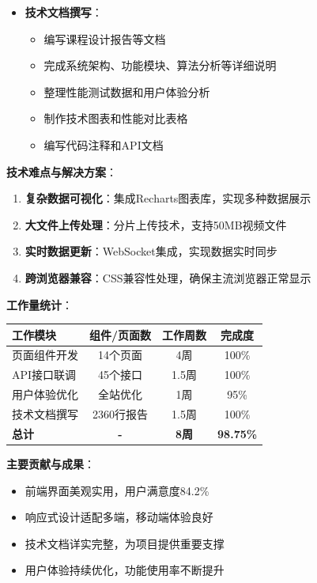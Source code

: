 \documentclass[12pt,a4paper]{article}
\begin{document}
\begin{itemize}
    \item \textbf{技术文档撰写}：
    \begin{itemize}
        \item 编写课程设计报告等文档
        \item 完成系统架构、功能模块、算法分析等详细说明
        \item 整理性能测试数据和用户体验分析
        \item 制作技术图表和性能对比表格
        \item 编写代码注释和API文档
    \end{itemize}
\end{itemize}

\textbf{技术难点与解决方案}：
\begin{enumerate}
    \item \textbf{复杂数据可视化}：集成Recharts图表库，实现多种数据展示
    \item \textbf{大文件上传处理}：分片上传技术，支持50MB视频文件
    \item \textbf{实时数据更新}：WebSocket集成，实现数据实时同步
    \item \textbf{跨浏览器兼容}：CSS兼容性处理，确保主流浏览器正常显示
\end{enumerate}

\textbf{工作量统计}：
\begin{center}
\begin{tabular}{|l|c|c|c|}
\hline
\textbf{工作模块} & \textbf{组件/页面数} & \textbf{工作周数} & \textbf{完成度} \\
\hline
页面组件开发 & 14个页面 & 4周 & 100\% \\
API接口联调 & 45个接口 & 1.5周 & 100\% \\
用户体验优化 & 全站优化 & 1周 & 95\% \\
技术文档撰写 & 2360行报告 & 1.5周 & 100\% \\
\hline
\textbf{总计} & \textbf{-} & \textbf{8周} & \textbf{98.75\%} \\
\hline
\end{tabular}
\end{center}

\textbf{主要贡献与成果}：
\begin{itemize}
    \item 前端界面美观实用，用户满意度84.2\%
    \item 响应式设计适配多端，移动端体验良好
    \item 技术文档详实完整，为项目提供重要支撑
    \item 用户体验持续优化，功能使用率不断提升
\end{itemize}
\end{document}
